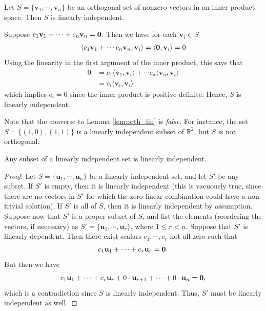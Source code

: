 \documentclass[12pt,letterpaper,reqno]{article}
\numberwithin{equation}{section}
\newcommand{\bv}{\mathbf{v}}
\newcommand{\bu}{\mathbf{u}}
\begin{document}
\begin{lem}\label{lem:orth_lin}
	Let $S=\{\bv_1,\cdots,\bv_n\}$ be an orthogonal set of nonzero vectors in an inner product space. Then $S$ is linearly independent.
\end{lem}

\begin{pf}
	Suppose $c_1 \bv_1+\cdots + c_n \bv_n={\bf 0}$. Then we have for each $\bv_i \in S$
	\begin{align*}
		\langle c_1\bv_1+\cdots c_n\bv_n,\bv_i\rangle =\langle {\bf 0},\bv_i\rangle = 0
	\end{align*}
	Using the linearity in the first argument of the inner product, this says that
	\begin{align*}
		0&=c_1\langle \bv_1,\bv_i\rangle+\cdots c_n\langle \bv_n,\bv_i\rangle \\
		&=c_i\langle \bv_i,\bv_i\rangle
	\end{align*}
	which implies $c_i=0$ since the inner product is positive-definite. Hence, $S$ is linearly independent.
\end{pf}

Note that the converse to Lemma  \ref{lem:orth_lin} is \emph{false}. For instance, the set $S=\{(1,0), (1,1)\}$ is a linearly independent subset of $\mathbb{R}^2$, but $S$ is not orthogonal. 

\begin{lem}\label{lem:LI_subset}
	Any subset of a linearly independent set is linearly independent.
\end{lem}

\begin{proof}
	Let $S=\{\bu_1,\cdots,\bu_n\}$ be a linearly independent set, and let $S'$ be any subset. If $S'$ is empty, then it is linearly independent (this is vacuously true, since there are no vectors in $S'$ for which the zero linear combination could have a non-trivial solution). If $S'$ is all of $S$, then it is linearly independent by assumption. Suppose now that $S'$ is a proper subset of $S$, and list the elements (reordering the vectors, if necessary) as $S'=\{\bu_1,\cdots,\bu_r\}$, where $1 \leq r < n$. Suppose that $S'$ is linearly dependent. Then there exist scalars $c_1,\cdots,c_r$ not all zero such that
	\begin{align*}
		c_1 \bu_1+\cdots+c_r \bu_r={\bf 0}.
	\end{align*}
But then we have 
\begin{align*}
	c_1 \bu_1+\cdots+c_r \bu_r+ 0\cdot \bu_{r+1}+\cdots+0\cdot \bu_n={\bf 0},
\end{align*}
which is a contradiction since $S$ is linearly independent. Thus, $S'$ must be linearly independent as well.
\end{proof}
\end{document}
